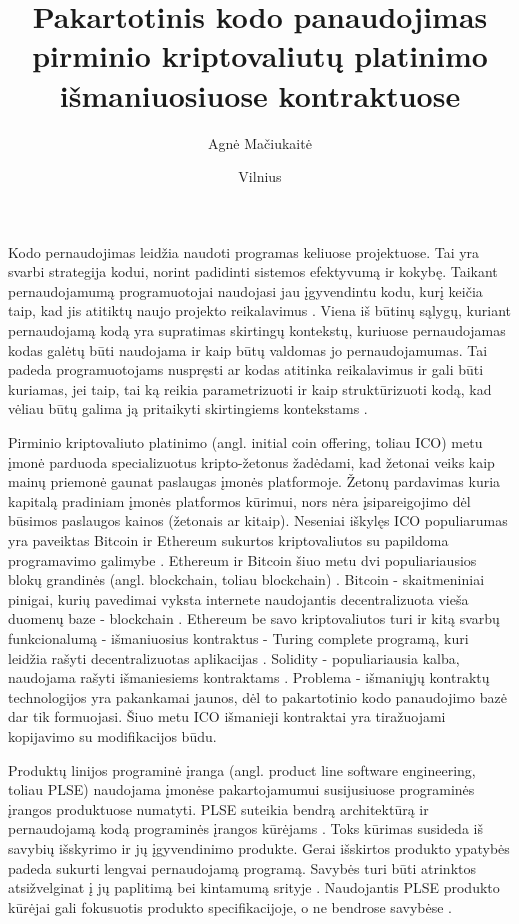 \documentclass{VUMIFPSkursinis}
\title{Pakartotinis kodo panaudojimas pirminio kriptovaliutų platinimo išmaniuosiuose kontraktuose}
\author{Agnė Mačiukaitė}
\date{Vilnius \\ \the\year}
\begin{document}
\maketitle

\tableofcontents


 \label{ivadas}

Kodo pernaudojimas leidžia naudoti programas keliuose projektuose. Tai yra svarbi strategija kodui, norint padidinti sistemos efektyvumą ir kokybę. Taikant pernaudojamumą programuotojai naudojasi jau įgyvendintu kodu, kurį keičia taip, kad jis atitiktų naujo projekto reikalavimus \cite {Ravichandran2003}. Viena iš būtinų sąlygų, kuriant pernaudojamą kodą yra supratimas skirtingų kontekstų, kuriuose pernaudojamas kodas galėtų būti naudojama ir kaip būtų valdomas jo pernaudojamumas. Tai padeda programuotojams nuspręsti ar kodas atitinka reikalavimus ir gali būti kuriamas, jei taip, tai ką reikia parametrizuoti ir kaip struktūrizuoti kodą, kad vėliau būtų galima ją pritaikyti skirtingiems kontekstams \cite{Kang1990}.

Pirminio kriptovaliuto platinimo (angl. initial coin offering, toliau ICO) metu įmonė parduoda specializuotus kripto-žetonus žadėdami, kad žetonai veiks kaip mainų priemonė gaunat paslaugas įmonės platformoje. Žetonų pardavimas kuria kapitalą pradiniam įmonės platformos kūrimui, nors nėra įsipareigojimo dėl būsimos paslaugos kainos (žetonais ar kitaip). Neseniai iškylęs ICO populiarumas yra paveiktas Bitcoin ir Ethereum sukurtos kriptovaliutos su papildoma programavimo galimybe \cite{Catalini2018}. Ethereum ir Bitcoin šiuo metu dvi populiariausios blokų grandinės (angl. blockchain, toliau blockchain) \cite{Luu}. Bitcoin - skaitmeniniai pinigai, kurių pavedimai vyksta internete naudojantis decentralizuota vieša duomenų baze - blockchain \cite{Swan2015}. Ethereum be savo kriptovaliutos turi ir kitą svarbų funkcionalumą - išmaniuosius kontraktus - Turing complete programą, kuri leidžia rašyti decentralizuotas aplikacijas \cite{Buterin2014}. Solidity - populiariausia kalba, naudojama rašyti išmaniesiems kontraktams \cite{Dannen}. Problema - išmaniųjų kontraktų technologijos yra pakankamai jaunos, dėl to pakartotinio kodo panaudojimo bazė dar tik formuojasi. Šiuo metu ICO išmanieji kontraktai yra tiražuojami kopijavimo su modifikacijos būdu.

Produktų linijos programinė įranga (angl. product line software engineering, toliau PLSE) naudojama įmonėse pakartojamumui susijusiuose programinės įrangos produktuose numatyti. PLSE suteikia bendrą architektūrą ir pernaudojamą kodą programinės įrangos kūrėjams \cite{Svahnberg}. Toks kūrimas susideda iš savybių išskyrimo ir jų įgyvendinimo produkte. Gerai išskirtos produkto ypatybės padeda sukurti lengvai pernaudojamą programą. Savybės turi būti atrinktos atsižvelginat į jų paplitimą bei kintamumą srityje \cite{Lee2015}. Naudojantis PLSE produkto kūrėjai gali fokusuotis produkto specifikacijoje, o ne bendrose savybėse \cite{Svahnberg}.
\end{document}
